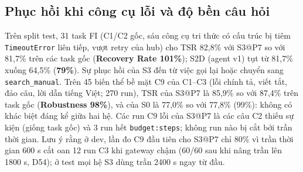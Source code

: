 \documentclass[11pt,a4paper,twocolumn]{article}
\begin{document}
\subsection{Phục hồi khi công cụ lỗi và độ bền câu hỏi}
Trên split test, 31 task FI (C1/C2 gốc, sáu công cụ tri thức có cấu trúc bị tiêm \texttt{TimeoutError} liên tiếp, vượt retry của hub) cho TSR 82,8\% với S3@P7 so với 81,7\% trên các task gốc (\textbf{Recovery Rate 101\%}); S2D (agent v1) tụt từ 81,7\% xuống 64,5\% (\textbf{79\%}). Sự phục hồi của S3 đến từ việc gọi lại hoặc chuyển sang \texttt{search\_manual}. Trên 45 biến thể bề mặt C9 của C1--C3 (lỗi chính tả, viết tắt, đảo câu, lời dẫn tiếng Việt; 270 run), TSR của S3@P7 là 85,9\% so với 87,4\% trên task gốc (\textbf{Robustness 98\%}), và của S0 là 77,0\% so với 77,8\% (99\%): không có khác biệt đáng kể giữa hai hệ. Các run C9 lỗi của S3@P7 là các câu C2 thiếu sự kiện (giống task gốc) và 3 run hết \texttt{budget:steps}; không run nào bị cắt bởi trần thời gian. Lưu ý rằng ở dev, lần đo C9 đầu tiên cho S3@P7 chỉ 80\% vì trần thời gian 600 s cắt oan 12 run C3 khi gateway chậm (60/60 sau khi nâng trần lên 1800 s, D54); ở test mọi hệ S3 dùng trần 2400 s ngay từ đầu.
\end{document}
